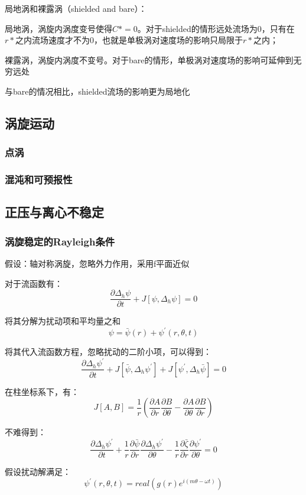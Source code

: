 \documentclass{article}
\begin{document}
局地涡和裸露涡（shielded and bare）：

局地涡，涡旋内涡度变号使得$C*=0$。对于shielded的情形远处流场为$0$，只有在$r*$之内流场速度才不为$0$，也就是单极涡对速度场的影响只局限于$r*$之内；

裸露涡，涡旋内涡度不变号。对于bare的情形，单极涡对速度场的影响可延伸到无穷远处

与bare的情况相比，shielded流场的影响更为局地化


\subsection{涡旋运动}
\subsubsection{点涡}
\subsubsection{混沌和可预报性}

\subsection{正压与离心不稳定}
\subsubsection{涡旋稳定的Rayleigh条件}
假设：轴对称涡旋，忽略外力作用，采用f平面近似

对于流函数有：
$$\frac{\partial\Delta_h\psi}{\partial t} + J[\psi, \Delta_h\psi] = 0$$

将其分解为扰动项和平均量之和
$$\psi = \bar{\psi}(r) + \psi^{\prime}(r,\theta,t)$$

将其代入流函数方程，忽略扰动的二阶小项，可以得到：
$$\frac{\partial\Delta_h\psi^{\prime}}{\partial t} + J[\bar{\psi}, \Delta_h\psi^{\prime}] +J[\psi^{\prime}, \Delta_h\bar{\psi}] = 0$$

在柱坐标系下，有：
$$J[A,B] = \frac{1}{r}(\frac{\partial A}{\partial r}\frac{\partial B}{\partial \theta}-\frac{\partial A}{\partial \theta}\frac{\partial B}{\partial r})$$

不难得到：
$$\frac{\partial\Delta_h\psi^{\prime}}{\partial t} + \frac{1}{r}\frac{\partial\bar{\psi}}{\partial r}\frac{\partial\Delta_h\psi^{\prime}}{\partial\theta} - \frac{1}{r}\frac{\partial\bar{\zeta}}{\partial r}\frac{\partial\psi^{\prime}}{\partial\theta} = 0$$

假设扰动解满足：
$$\psi^{\prime}(r,\theta,t)=real\left(g(r)e^{i(m\theta-\omega t)}\right)$$
\end{document}
